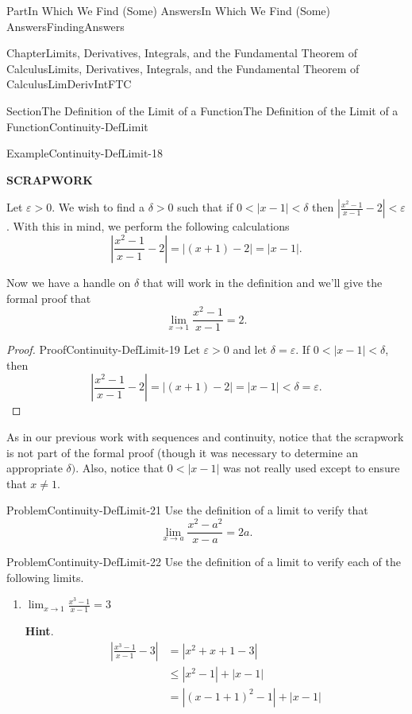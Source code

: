 \documentclass[oneside,10pt,]{book}
\newcommand{\blocktitlefont}{\relax}
\newcommand{\terminology}[1]{\textbf{#1}}
\numberwithin{equation}{part}
\newcommand{\abs}[1]{\left|#1\right|}
\def\limit#1#2#3{{\displaystyle\lim_{#1\rightarrow #2}#3}}
\newcommand{\eps}{\varepsilon}
\newcommand{\lt}{<}
\newcommand{\amp}{&}
\begin{document}
\begin{partptx}{Part}{In Which We Find (Some) Answers}{}{In Which We Find (Some) Answers}{}{}{FindingAnswers}
\begin{chapterptx}{Chapter}{Limits, Derivatives, Integrals, and the Fundamental Theorem of Calculus}{}{Limits, Derivatives, Integrals, and the Fundamental Theorem of Calculus}{}{}{LimDerivIntFTC}
\begin{sectionptx}{Section}{The Definition of the Limit of a Function}{}{The Definition of the Limit of a Function}{}{}{Continuity-DefLimit}
\begin{example}{Example}{}{Continuity-DefLimit-18}
\par
\terminology{SCRAPWORK}%
\par
Let \(\eps>0\).  We wish to find a \(\delta>0\) such that if \(0\lt \abs{x-1}\lt \delta\) then \(\abs{\frac{x^2-1}{x-1}-2}\lt \eps\).  With this in mind, we perform the following calculations%
\begin{equation*}
\abs{\frac{x^2-1}{x-1}-2}=\abs{(x+1)-2} = \abs{x-1} \text{.}
\end{equation*}
%
\par
Now we have a handle on \(\delta\) that will work in the definition and we'll give the formal proof that%
\begin{equation*}
\limit{x}{1}{\frac{x^2-1}{x-1}}=2 \text{.}
\end{equation*}
%
\end{example}
\begin{proof}{Proof}{}{Continuity-DefLimit-19}
Let \(\eps>0\) and let \(\delta=\eps\).  If \(0\lt
\abs{x-1}\lt \delta\), then%
\begin{equation*}
\abs{\frac{x^2-1}{x-1}-2}=\abs{(x+1)-2}=\abs{x-1}\lt
\delta=\eps \text{.}
\end{equation*}
%
\end{proof}
As in our previous work with sequences and continuity, notice that the scrapwork is not part of the formal proof (though it was necessary to determine an appropriate \(\delta)\).  Also, notice that \(0\lt \abs{x-1}\) was not really used except to ensure that \(x\neq 1\).%
\begin{problem}{Problem}{}{Continuity-DefLimit-21}%
Use the definition of a limit to verify that%
\begin{equation*}
\limit{x}{a}{\frac{x^2-a^2}{x-a}}=2a.{} 
\end{equation*}
%
\end{problem}
\begin{problem}{Problem}{}{Continuity-DefLimit-22}%
Use the definition of a limit to verify each of the following limits.%
\begin{enumerate}[font=\bfseries,label=(\alph*),ref=\alph*]%
\item{}\(\limit{x}{1}{\frac{x^3-1}{x-1}}=3\)%
\par\smallskip%
\noindent\textbf{\blocktitlefont Hint}.\hypertarget{Continuity-DefLimit-22-3-2}{}\quad{}%
\begin{align*}
\abs{\frac{x^3-1}{x-1}-3} \amp =
\abs{x^2+x+1-3} \\
\amp \leq\abs{x^2-1}+\abs{x-1}\\
\amp =\abs{(x-1+1)^2-1}+\abs{x-1} \\

\end{align*}
\end{enumerate}
\end{problem}
\end{sectionptx}
\end{chapterptx}
\end{partptx}
\end{document}
